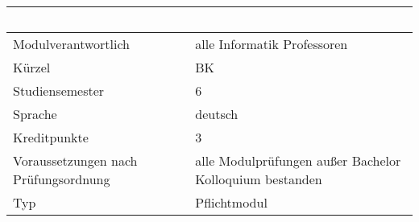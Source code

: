 \begin{longtable}[]{@{}ll@{}}
\toprule
\begin{minipage}[b]{0.12\columnwidth}\raggedright\strut
~\strut
\end{minipage} & \begin{minipage}[b]{0.12\columnwidth}\raggedright\strut
~\strut
\end{minipage}\tabularnewline
\midrule
\endhead
\begin{minipage}[t]{0.12\columnwidth}\raggedright\strut
Modulverantwortlich\strut
\end{minipage} & \begin{minipage}[t]{0.12\columnwidth}\raggedright\strut
alle Informatik Professoren\strut
\end{minipage}\tabularnewline
\begin{minipage}[t]{0.12\columnwidth}\raggedright\strut
Kürzel\strut
\end{minipage} & \begin{minipage}[t]{0.12\columnwidth}\raggedright\strut
BK\strut
\end{minipage}\tabularnewline
\begin{minipage}[t]{0.12\columnwidth}\raggedright\strut
Studiensemester\strut
\end{minipage} & \begin{minipage}[t]{0.12\columnwidth}\raggedright\strut
6\strut
\end{minipage}\tabularnewline
\begin{minipage}[t]{0.12\columnwidth}\raggedright\strut
Sprache\strut
\end{minipage} & \begin{minipage}[t]{0.12\columnwidth}\raggedright\strut
deutsch\strut
\end{minipage}\tabularnewline
\begin{minipage}[t]{0.12\columnwidth}\raggedright\strut
Kreditpunkte\strut
\end{minipage} & \begin{minipage}[t]{0.12\columnwidth}\raggedright\strut
3\strut
\end{minipage}\tabularnewline
\begin{minipage}[t]{0.12\columnwidth}\raggedright\strut
Voraussetzungen nach Prüfungsordnung\strut
\end{minipage} & \begin{minipage}[t]{0.12\columnwidth}\raggedright\strut
alle Modulprüfungen außer Bachelor Kolloquium bestanden\strut
\end{minipage}\tabularnewline
\begin{minipage}[t]{0.12\columnwidth}\raggedright\strut
Typ\strut
\end{minipage} & \begin{minipage}[t]{0.12\columnwidth}\raggedright\strut
Pflichtmodul\strut
\end{minipage}\tabularnewline
\bottomrule
\end{longtable}

